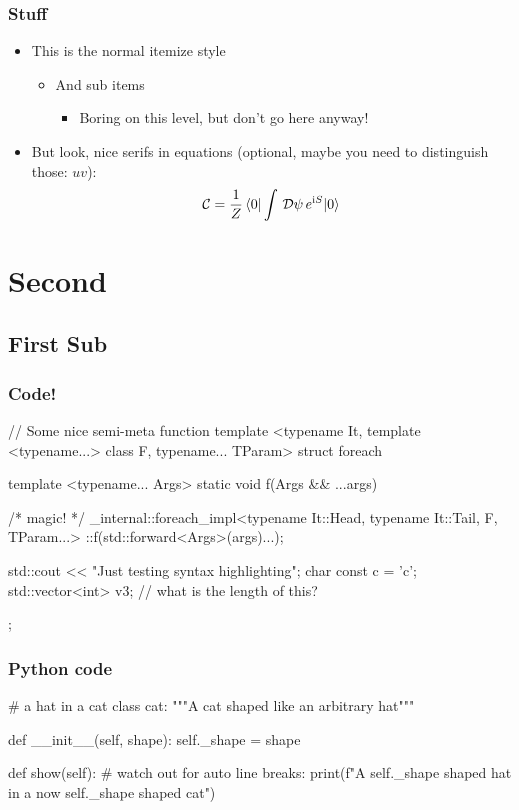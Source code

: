\documentclass[mathserif, fleqn]{beamer}
\begin{document}
\begin{frame}\frametitle{Stuff}
  \begin{itemize}
  \item This is the normal itemize style
    \begin{itemize}
    \item And sub items
      \begin{itemize}
      \item Boring on this level, but don't go here anyway!
      \end{itemize}
    \end{itemize}

  \item But look, nice serifs in equations (optional, maybe you need to distinguish those: $uv$):
    \begin{align*}
      \mathcal{C} = \frac1{Z} \braket{0|\int\,\mathcal{D}\psi\,e^{\mathrm{i} S}|0}
    \end{align*}
  \end{itemize}
\end{frame}

\section{Second}
\subsection{First Sub}
\begin{frame}[fragile]\frametitle{Code!}
  \begin{cppcode}[caption={A test C++ listing}]
// Some nice semi-meta function
template <typename It,
          template <typename...> class F,
          typename... TParam>
struct foreach {
  template <typename... Args>
  static void f(Args && ...args) {
    /* magic! */
    _internal::foreach_impl<typename It::Head,
                            typename It::Tail,
                            F,
                            TParam...>
        ::f(std::forward<Args>(args)...);

    std::cout << "Just testing syntax highlighting\n";
    char const c = 'c';
    std::vector<int> v{3};  // what is the length of this?
  }
};
  \end{cppcode}
\end{frame}

\begin{frame}[fragile]\frametitle{{\dvfamily Python} code}
  \begin{pycode}[caption={Some Python as well}]
# a hat in a cat
class cat:
  """A cat shaped like an arbitrary hat"""

  def __init__(self, shape):
    self._shape = shape

  def show(self):
    # watch out for auto line breaks:
    print(f"A {self._shape} shaped hat in a now {self._shape} shaped cat")
  \end{pycode}
\end{frame}
\end{document}
